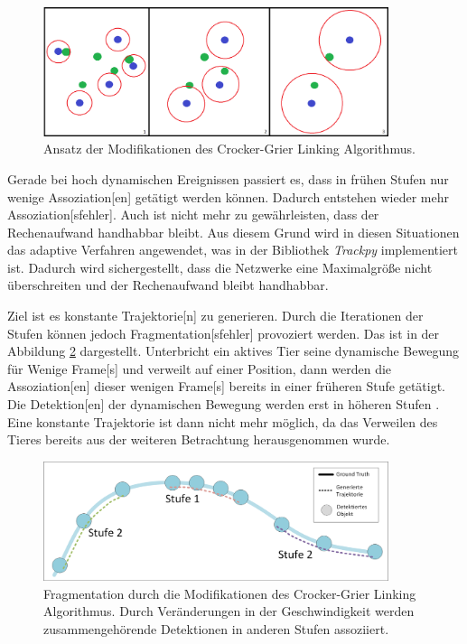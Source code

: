 \begin{figure}[htb]
    \centering
    \includegraphics[width=0.9\textwidth]{img/Grafiken/CrockGrierMod Funktionsprinzip.png}
    \caption[Ansatz der Modifikationen des Crocker-Grier Linking Algorithmus.]{Ansatz der Modifikationen des Crocker-Grier Linking Algorithmus.}
    \label{fig:funkCrockGrierMod}
\end{figure}

Gerade bei hoch dynamischen Ereignissen passiert es, dass in frühen Stufen nur wenige \gls{Assoziation}[en] getätigt werden können. Dadurch entstehen wieder mehr \gls{Assoziation}[sfehler]. Auch ist nicht mehr zu gewährleisten, dass der Rechenaufwand handhabbar bleibt. Aus diesem Grund wird in diesen Situationen das adaptive Verfahren angewendet, was in der \gls{Bibliothek} \textit{Trackpy} \cite{Allan.2023} implementiert ist. Dadurch wird sichergestellt, dass die Netzwerke eine Maximalgröße nicht überschreiten und der Rechenaufwand bleibt handhabbar. \par

Ziel ist es konstante \gls{Trajektorie}[n] zu generieren. Durch die Iterationen der Stufen können jedoch \gls{Fragmentation}[sfehler] provoziert werden. Das ist in der Abbildung \ref{fig:bspCrockGrierFrag} dargestellt. Unterbricht ein aktives Tier seine dynamische Bewegung für Wenige \gls{Frame}[s] und verweilt auf einer Position, dann werden die \gls{Assoziation}[en] dieser wenigen \gls{Frame}[s] bereits in einer früheren Stufe getätigt. Die \gls{Detektion}[en] der dynamischen Bewegung werden erst in höheren Stufen . Eine konstante \gls{Trajektorie} ist dann nicht mehr möglich, da das Verweilen des Tieres bereits aus der weiteren Betrachtung herausgenommen wurde. 

\begin{figure}[htb]
    \centering
    \includegraphics[width=0.9\textwidth]{img/Grafiken/Fragmentation durch Stufen.png}
    \caption[Fragmentation durch die Modifikationen des Crocker-Grier Linking Algorithmus.]{Fragmentation durch die Modifikationen des Crocker-Grier Linking Algorithmus. Durch Veränderungen in der Geschwindigkeit werden zusammengehörende Detektionen in anderen Stufen assoziiert.}
    \label{fig:bspCrockGrierFrag}
\end{figure}

